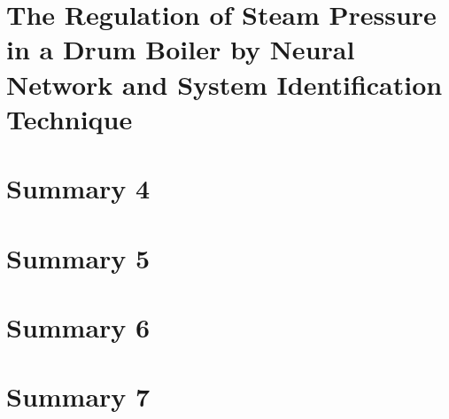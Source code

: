 \documentclass[12pt]{article} %
\begin{document}

\section{The Regulation of Steam Pressure in a Drum Boiler by Neural Network and System Identification Technique} %

\section{Summary 4} %

\section{Summary 5} %

\section{Summary 6} %

\section{Summary 7} %

\end{document}
